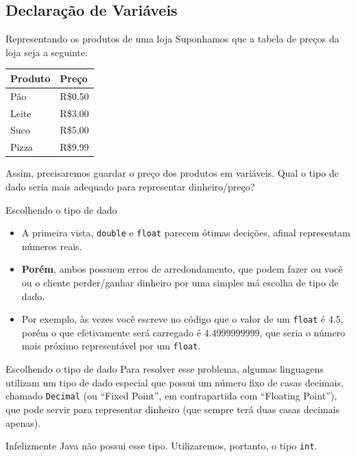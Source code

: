 \documentclass{beamer}
\begin{document}
\subsection{Declaração de Variáveis}

\begin{frame}{Representando os produtos de uma loja}
    Suponhamos que a tabela de preços da loja seja a seguinte:

    \begin{center}
        \begin{tabular}{ll}
            \toprule
            Produto & Preço \\
            \midrule
            Pão   & R\$0.50 \\
            Leite & R\$3.00 \\
            Suco  & R\$5.00 \\
            Pizza & R\$9.99 \\
            \bottomrule
        \end{tabular}
    \end{center}

    Assim, precisaremos guardar o preço dos produtos em variáveis.
    Qual o tipo de dado seria mais adequado para representar dinheiro/preço?
\end{frame}

\begin{frame}{Escolhendo o tipo de dado}
    \begin{itemize}
        \item A primeira vista, \texttt{double} e \texttt{float} parecem ótimas
            decições, afinal representam números reais.
        \item \textbf{Porém}, ambos possuem erros de arredondamento, que podem
            fazer ou você ou o cliente perder/ganhar dinheiro por uma simples
            má escolha de tipo de dado.
        \item Por exemplo, às vezes você escreve no código que o valor de um
            \texttt{float} é $4.5$, porém o que efetivamente será carregado é
            $4.4999999999$, que seria o número mais próximo representável por
            um \texttt{float}.
    \end{itemize}
\end{frame}

\begin{frame}{Escolhendo o tipo de dado}
    Para resolver esse problema, algumas linguagens utilizam um tipo de dado
    especial que possui um número fixo de casas decimais, chamado
    \texttt{Decimal} (ou ``Fixed Point'', em contrapartida com ``Floating Point''),
    que pode servir para representar dinheiro (que sempre terá duas casas
    decimais apenas).

    Infelizmente Java não possui esse tipo. Utilizaremos, portanto, o tipo
    \texttt{int}.
\end{frame}
\end{document}
